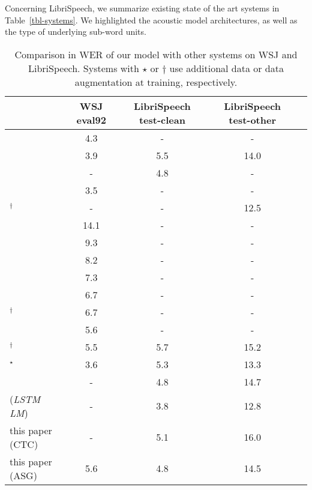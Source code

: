 \documentclass{article}
\begin{document}
Concerning LibriSpeech, we summarize existing state of the art systems in
Table~\ref{tbl-systems}. We highlighted the acoustic model architectures,
as well as the type of underlying sub-word units.

\begin{table}
    \caption{Comparison in WER of our model with other systems on
      WSJ and LibriSpeech. Systems with $\star$ or $\dagger$ use additional data or
      data augmentation at training, respectively.}
    \label{tbl-best-wer}
    \begin{center}
      \small
    \begin{tabular}{lcccc}
      \toprule
      & WSJ eval92 & LibriSpeech test-clean & LibriSpeech test-other \\ \midrule
      \citep{povey2016mmi} & 4.3 & - & - \\
      \citep{panayotov2015librispeech} & 3.9 & 5.5 & 14.0 \\
      \citep{peddinti2015time} & - & 4.8 & - \\
      \citep{chan2015rnn} & 3.5 & - & - \\
      \citep{ko2015audio}$^{\dagger}$ & - & - & 12.5 \\
      \midrule
      \citep{hannun2014birec} & 14.1 & - & - \\
      \citep{bahdanau2016attention} & 9.3 & - & - \\
      \citep{graves2014towards} & 8.2 & - & - \\
      \citep{miao2015eesen} & 7.3 & - & - \\
      \citep{chorowski2016seqseq} & 6.7 & - & - \\
      \citep{gramctc}$^{\dagger}$ & 6.7 & - & - \\
      \citep{hori2017multi} & 5.6 & - & - \\
      \citep{zhou2018policy}$^{\dagger}$ & 5.5 & 5.7 & 15.2 \\
      \citep{amodei2015deep}$^{\star}$ & 3.6 & 5.3 & 13.3 \\
      \citep{zeyer2018improved} & - & 4.8 & 14.7 \\
      \citep{zeyer2018improved} (\emph{LSTM LM}) & - & 3.8 & 12.8 \\
      \midrule
      this paper (CTC) & - & 5.1 & 16.0 \\
      this paper (ASG) & 5.6 & 4.8 & 14.5 \\
      \bottomrule
    \end{tabular}
    \end{center}
\end{table}
\end{document}
